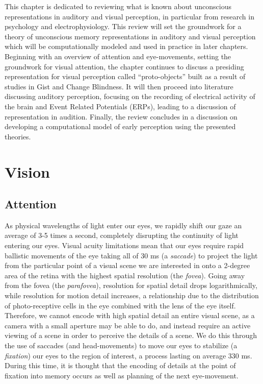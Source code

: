 This chapter is dedicated to reviewing what is known about unconscious representations in auditory and visual perception, in particular from research in psychology and electrophysiology.  This review will set the groundwork for a theory of unconscious memory representations in auditory and visual perception which will be computationally modeled and used in practice in later chapters.  Beginning with an overview of attention and eye-movements, setting the groundwork for visual attention, the chapter continues to discuss a presiding representation for visual perception called ``proto-objects'' built as a result of studies in Gist and Change Blindness.  It will then proceed into literature discussing auditory perception, focusing on the recording of electrical activity of the brain and Event Related Potentials (ERPs), leading to a discussion of representation in audition.  Finally, the review concludes in a discussion on developing a computational model of early perception using the presented theories.  

\section{Vision}

\subsection{Attention}

As physical wavelengths of light enter our eyes, we rapidly shift our gaze an average of 3-5 times a second, completely disrupting the continuity of light entering our eyes.  Visual acuity limitations mean that our eyes require rapid ballistic movements of the eye taking all of 30 ms (a \textit{saccade}) to project the light from the particular point of a visual scene we are interested in onto a 2-degree area of the retina with the highest spatial resolution (the \textit{fovea}).  Going away from the fovea (the \textit{parafovea}), resolution for spatial detail drops logarithmically, while resolution for motion detail increases, a relationship due to the distribution of photo-receptive cells in the eye combined with the lens of the eye itself.  Therefore, we cannot encode with high spatial detail an entire visual scene, as a camera with a small aperture may be able to do, and instead require an active viewing of a scene in order to perceive the details of a scene.  We do this through the use of saccades (and head-movements) to move our eyes to stabilize (a \textit{fixation}) our eyes to the region of interest, a process lasting on average 330 ms.  During this time, it is thought that the encoding of details at the point of fixation into memory occurs as well as planning of the next eye-movement.  

